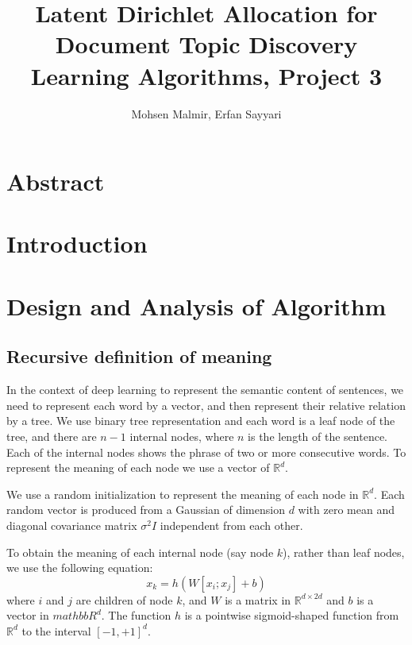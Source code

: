 \documentclass[twoside,12pt]{article}
\begin{document}
\title{Latent Dirichlet Allocation for Document Topic Discovery\\  Learning Algorithms, Project 3}
\author{Mohsen Malmir, Erfan Sayyari}
\maketitle

\section{Abstract}

\section{Introduction}

\section{Design and Analysis of Algorithm}

\subsection{Recursive definition of meaning}
In the context of deep learning to represent the semantic content of sentences, we need to represent each word by a vector, and then represent their relative relation by a tree. We use binary tree representation and each word is a leaf node of the tree, and there are $n-1$ internal nodes, where $n$ is the length of the sentence. Each of the internal nodes shows the phrase of two or more consecutive words. To represent the meaning of each node we use a vector of $\mathbb{R}^d$.

We use a random initialization to represent the meaning of each node in $\mathbb{R}^d$. Each random vector is produced from a Gaussian of dimension $d$ with zero mean and diagonal covariance matrix $\sigma^2I$ independent from each other. 

To obtain the meaning of each internal node (say node $k$), rather than leaf nodes, we use the following equation:
\begin{equation}
x_k=h(W[x_i;x_j]+b)
\end{equation}
where $i$ and $j$ are children of node $k$, and $W$ is a matrix in $\mathbb{R}^{d\times2d}$ and $b$ is a vector in $mathbb{R}^d$. The function $h$ is a pointwise sigmoid-shaped function from $\mathbb{R}^d$ to the interval $[-1,+1]^d$.
\end{document}
